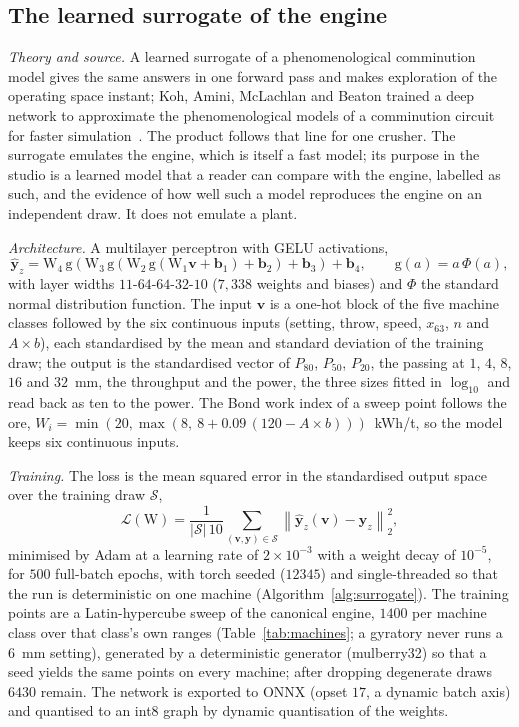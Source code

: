 \subsection{The learned surrogate of the engine}\label{sec:m-surrogate}

\emph{Theory and source.} A learned surrogate of a phenomenological comminution model gives the same answers in one forward pass and
makes exploration of the operating space instant; Koh, Amini, McLachlan and Beaton trained a deep network to approximate the
phenomenological models of a comminution circuit for faster simulation~\cite{koh2021}. The product follows that line for one crusher.
The surrogate emulates the engine, which is itself a fast model; its purpose in the studio is a learned model that a reader can compare
with the engine, labelled as such, and the evidence of how well such a model reproduces the engine on an independent draw. It does not
emulate a plant.

\emph{Architecture.} A multilayer perceptron with GELU activations,
\begin{equation}
\hat{\mathbf y}_z = \mathrm W_4\,\mathrm{g}\!\left(\mathrm W_3\,\mathrm{g}\!\left(\mathrm W_2\,\mathrm{g}\!\left(\mathrm W_1\mathbf v + \mathbf b_1\right) + \mathbf b_2\right) + \mathbf b_3\right) + \mathbf b_4,
\qquad \mathrm{g}(a) = a\,\Phi(a),
\label{eq:mlp}
\end{equation}
with layer widths $11$-$64$-$64$-$32$-$10$ ($7{,}338$ weights and biases) and $\Phi$ the standard normal distribution function. The input
$\mathbf v$ is a one-hot block of the five machine classes followed by the six continuous inputs (setting, throw, speed, $x_{63}$, $n$ and
$A\times b$), each standardised by the mean and standard deviation of the training draw; the output is the standardised vector of
$P_{80}$, $P_{50}$, $P_{20}$, the passing at $1$, $4$, $8$, $16$ and $32$~mm, the throughput and the power, the three sizes fitted in
$\log_{10}$ and read back as ten to the power. The Bond work index of a sweep point follows the ore, $W_i=\min(20,\max(8,\ 8+0.09\,(120-A\times
b)))$~kWh/t, so the model keeps six continuous inputs.

\emph{Training.} The loss is the mean squared error in the standardised output space over the training draw $\mathcal S$,
\begin{equation}
\mathcal L(\mathrm W) = \frac{1}{|\mathcal S|\,10}\sum_{(\mathbf v,\mathbf y)\in\mathcal S}\left\|\hat{\mathbf y}_z(\mathbf v) - \mathbf y_z\right\|_2^2 ,
\label{eq:mse}
\end{equation}
minimised by Adam at a learning rate of $2\times10^{-3}$ with a weight decay of $10^{-5}$, for $500$ full-batch epochs, with torch seeded
($12345$) and single-threaded so that the run is deterministic on one machine (Algorithm~\ref{alg:surrogate}). The training points are a
Latin-hypercube sweep of the canonical engine, $1400$ per machine class over that class's own ranges (Table~\ref{tab:machines}; a gyratory
never runs a $6$~mm setting), generated by a deterministic generator (mulberry32) so that a seed yields the same points on every machine; after dropping degenerate draws $6430$ remain. The network is exported to ONNX (opset $17$, a dynamic batch axis) and
quantised to an int8 graph by dynamic quantisation of the weights.

